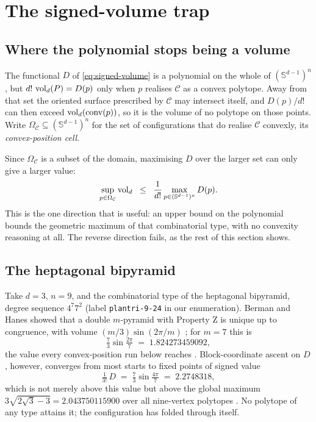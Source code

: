 \section{The signed-volume trap}
\label{sec:trap}

\subsection{Where the polynomial stops being a volume}

The functional $D$ of \eqref{eq:signed-volume} is a polynomial on the whole of
$(\mathbb{S}^{d-1})^{n}$, but $d!\,\operatorname{vol}_{d}(P) = D(p)$ only when $p$ realises
$\mathcal{C}$ as a convex polytope. Away from that set the oriented surface
prescribed by $\mathcal{C}$ may intersect itself, and $D(p)/d!$ can then exceed
$\operatorname{vol}_{d}(\operatorname{conv}(p))$, so it is the volume of no polytope on those points. Write
$\Omega_{\mathcal{C}} \subseteq (\mathbb{S}^{d-1})^{n}$ for the set of
configurations that do realise $\mathcal{C}$ convexly, its
\emph{convex-position cell}.

Since $\Omega_{\mathcal{C}}$ is a subset of the domain, maximising $D$ over the
larger set can only give a larger value:
\begin{equation}
  \label{eq:relaxation}
  \sup_{p \in \Omega_{\mathcal{C}}} \operatorname{vol}_{d}
  \;\;\leq\;\;
  \frac{1}{d!}\max_{p \in (\mathbb{S}^{d-1})^{n}} D(p) .
\end{equation}
This is the one direction that is useful: an upper bound on the polynomial
bounds the geometric maximum of that combinatorial type, with no convexity
reasoning at all. The reverse direction fails, as the rest of this section
shows.

\subsection{The heptagonal bipyramid}

Take $d = 3$, $n = 9$, and the combinatorial type of the heptagonal bipyramid,
degree sequence $4^{7}7^{2}$ (label \texttt{plantri-9-24} in our enumeration).
Berman and Hanes showed that a double $m$-pyramid with Property Z is unique up
to congruence, with volume $(m/3)\sin(2\pi/m)$ \cite{berman-hanes-1970}; for
$m = 7$ this is
\begin{equation*}
  \tfrac{7}{3}\sin\tfrac{2\pi}{7} \;=\; 1.824273459092 ,
\end{equation*}
the value every convex-position run below reaches .
Block-coordinate ascent on $D$, however, converges from most starts to fixed
points of signed value
\begin{equation*}
  \tfrac{1}{3!}\,D \;=\; \tfrac{7}{3}\sin\tfrac{4\pi}{7} \;=\; 2.2748318,
\end{equation*}
which is not merely above this value but above the global maximum
$3\sqrt{2\sqrt{3}-3} = 2.043750115900$ over all nine-vertex polytopes
\cite{hoehner-ledford-2026}. No polytope of any type attains it; the
configuration has folded through itself.

